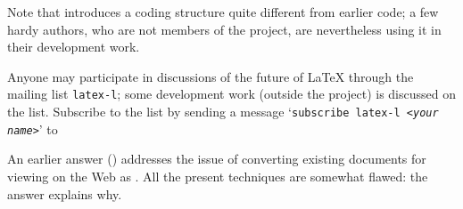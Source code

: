 Note that  introduces a coding structure quite
different from earlier \latex{} code; a few hardy authors, who are not
members of the project, are nevertheless using it in their development
work.

Anyone may participate in discussions of the future of \LaTeX{}
through the mailing list \texttt{latex-l}; some development work
(outside the project) is discussed on the list.  Subscribe to the list
by sending a message `\texttt{subscribe latex-l <\emph{your name}>}'
to  
\begin{ctanrefs}
\item[l3experimental \nothtml{\rmfamily}bundle]
\item[l3kernel \nothtml{\rmfamily}bundle]
\item[\nothtml{\rmfamily}\LaTeX{} project publications]
\item[l3packages \nothtml{\rmfamily}bundle]
\end{ctanrefs}


An earlier answer %
()
addresses the issue of converting existing \AllTeX{} documents for
viewing on the Web as .  All the present techniques are
somewhat flawed: the answer explains why.

